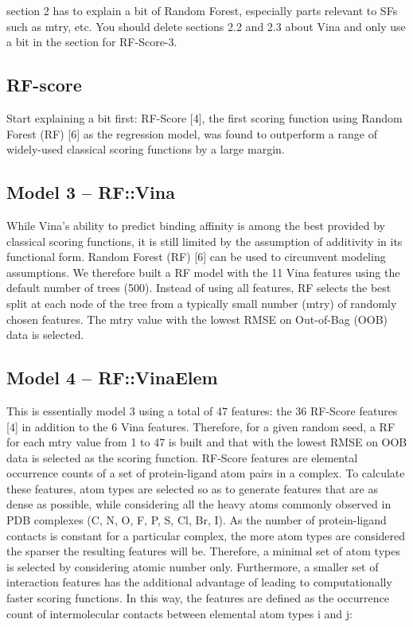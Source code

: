 \documentclass{llncs}
\begin{document}
section 2 has to explain a bit of Random Forest, especially parts relevant to SFs such as mtry, etc. You should delete sections 2.2 and 2.3 about Vina and only use a bit in the section for RF-Score-3.

\subsection{RF-score}

Start explaining a bit first: RF-Score [4], the first scoring function using Random Forest (RF) [6] as the regression model, was found to outperform a range of widely-used classical scoring functions by a large margin.

\subsection{Model 3 – RF::Vina}

While Vina’s ability to predict binding affinity is among the best provided by classical scoring functions, it is still limited by the assumption of additivity in its functional form. Random Forest (RF) [6] can be used to circumvent modeling assumptions. We therefore built a RF model with the 11 Vina features using the default number of trees (500). Instead of using all features, RF selects the best split at each node of the tree from a typically small number (mtry) of randomly chosen features. The mtry value with the lowest RMSE on Out-of-Bag (OOB) data is selected.

\subsection{Model 4 – RF::VinaElem}

This is essentially model 3 using a total of 47 features: the 36 RF-Score features [4] in addition to the 6 Vina features. Therefore, for a given random seed, a RF for each mtry value from 1 to 47 is built and that with the lowest RMSE on OOB data is selected as the scoring function. RF-Score features are elemental occurrence counts of a set of protein-ligand atom pairs in a complex. To calculate these features, atom types are selected so as to generate features that are as dense as possible, while considering all the heavy atoms commonly observed in PDB complexes (C, N, O, F, P, S, Cl, Br, I). As the number of protein-ligand contacts is constant for a particular complex, the more atom types are considered the sparser the resulting features will be. Therefore, a minimal set of atom types is selected by considering atomic number only. Furthermore, a smaller set of interaction features has the additional advantage of leading to computationally faster scoring functions. In this way, the features are defined as the occurrence count of intermolecular contacts between elemental atom types i and j:
\end{document}
